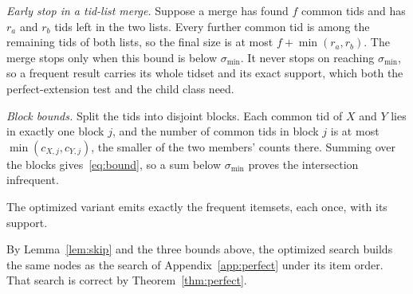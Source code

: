 \emph{Early stop in a tid-list merge.} Suppose a merge has found $f$ common tids and has
$r_a$ and $r_b$ tids left in the two lists. Every further common tid is among the
remaining tids of both lists, so the final size is at most $f + \min(r_a, r_b)$. The
merge stops only when this bound is below $\sigma_{\min}$. It never stops on reaching
$\sigma_{\min}$, so a frequent result carries its whole tidset and its exact support,
which both the perfect-extension test and the child class need.

\emph{Block bounds.} Split the tids into disjoint blocks. Each common tid of $X$ and $Y$
lies in exactly one block $j$, and the number of common tids in block $j$ is at most
$\min(c_{X,j}, c_{Y,j})$, the smaller of the two members' counts there. Summing over the
blocks gives~\eqref{eq:bound}, so a sum below $\sigma_{\min}$ proves the intersection
infrequent.

\begin{theorem}
The optimized variant emits exactly the frequent itemsets, each once, with its support.
\end{theorem}
\begin{IEEEproof}
By Lemma~\ref{lem:skip} and the three bounds above, the optimized search builds the same
nodes as the search of Appendix~\ref{app:perfect} under its item order. That search is
correct by Theorem~\ref{thm:perfect}.
\end{IEEEproof}
